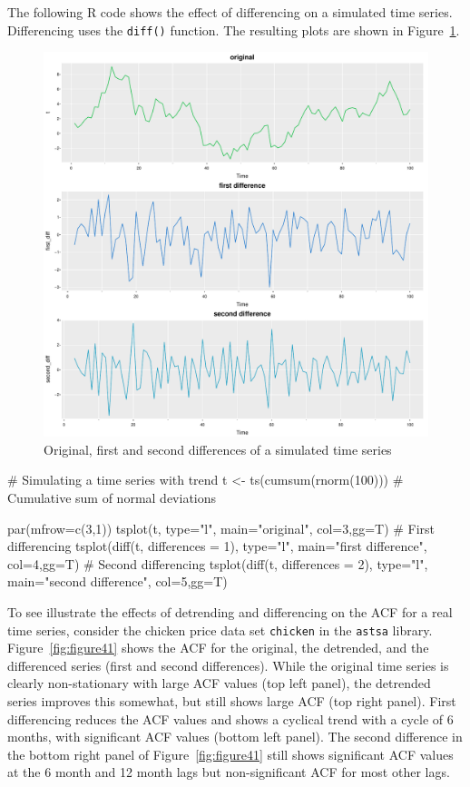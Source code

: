 The following R code shows the effect of differencing on a simulated time series. Differencing uses the \texttt{diff()} function. The resulting plots are shown in Figure~\ref{fig:figure40a}.

\begin{figure}
\centering
\includegraphics[width=.75\textwidth]{figure40a.pdf}
\caption{Original, first and second differences of a simulated time series}
\label{fig:figure40a}
\end{figure}

\begin{samepage}
\begin{Rcode}
# Simulating a time series with trend
t <- ts(cumsum(rnorm(100)))  # Cumulative sum of normal deviations

par(mfrow=c(3,1))
tsplot(t, type="l", main="original", col=3,gg=T)
# First differencing
tsplot(diff(t, differences = 1), type="l", 
    main="first difference", col=4,gg=T)
# Second differencing
tsplot(diff(t, differences = 2), type="l", 
    main="second difference", col=5,gg=T)
\end{Rcode}
\end{samepage}

To see illustrate the effects of detrending and differencing on the ACF for a real time series, consider the chicken price data set \texttt{chicken} in the \texttt{astsa} library. Figure~\ref{fig:figure41} shows the ACF for the original, the detrended, and the differenced series (first and second differences). While the original time series is clearly non-stationary with large ACF values (top left panel), the detrended series improves this somewhat, but still shows large ACF (top right panel). First differencing reduces the ACF values and shows a cyclical trend with a cycle of 6 months, with significant ACF values (bottom left panel). The second difference in the bottom right panel of Figure~\ref{fig:figure41} still shows significant ACF values at the 6 month and 12 month lags but non-significant ACF for most other lags. 

